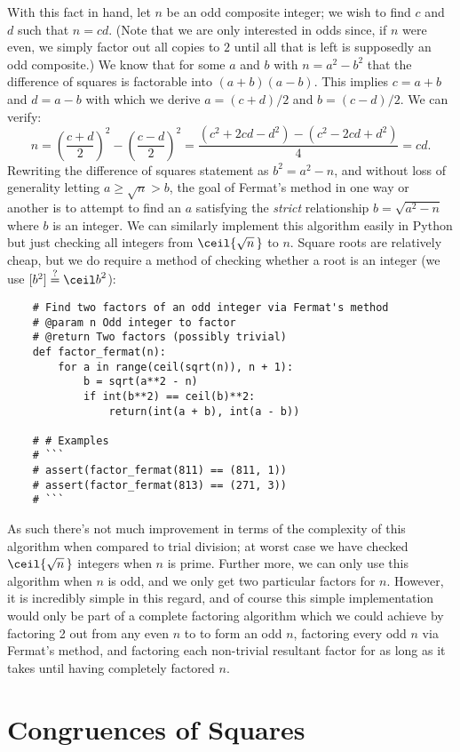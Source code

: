 \documentclass{report}
\begin{document}
With this fact in hand, let $n$ be an odd composite integer; we wish to find $c$ and $d$ such that
$n=cd$.
(Note that we are only interested in odds since, if $n$ were even, we simply factor out all copies
to $2$ until all that is left is supposedly an odd composite.) We know that for some $a$ and $b$
with $n=a^2-b^2$ that the difference of squares is factorable into $(a+b)(a-b)$. This implies
$c=a+b$ and $d=a-b$ with which we derive $a=(c+d)/2$ and $b=(c-d)/2$. We can verify:
\[
    n
    = {\left(\frac{c+d}{2}\right)}^2-{\left(\frac{c-d}{2}\right)}^2
    = \frac{(c^2+2cd-d^2)-(c^2-2cd+d^2)}{4} = cd.
\]
Rewriting the difference of squares statement as $b^2=a^2-n$,
and without loss of generality letting $a\ge\sqrt{n}>b$,
the goal of Fermat's method in one way or another is to attempt to find an $a$
satisfying the \emph{strict} relationship $b=\sqrt{a^2-n}$ where $b$ is an integer.
We can similarly implement this algorithm easily in Python but just checking all integers
from $\ceil{\sqrt{n}\,}$ to $n$.
Square roots are relatively cheap, but we do require a method of checking whether a root is an
integer (we use $[b^2]\overset{?}{=}{\ceil b}^2$):
\begin{verbatim}
    # Find two factors of an odd integer via Fermat's method
    # @param n Odd integer to factor
    # @return Two factors (possibly trivial)
    def factor_fermat(n):
        for a in range(ceil(sqrt(n)), n + 1):
            b = sqrt(a**2 - n)
            if int(b**2) == ceil(b)**2:
                return(int(a + b), int(a - b))

    # # Examples
    # ```
    # assert(factor_fermat(811) == (811, 1))
    # assert(factor_fermat(813) == (271, 3))
    # ```
\end{verbatim}
As such there's not much improvement in terms of the complexity of this algorithm when compared to
trial division; at worst case we have checked $\ceil{\sqrt{n}\,}$ integers when $n$ is prime.
Further more, we can only use this algorithm when $n$ is odd, and we only get two particular factors
for $n$. However, it is incredibly simple in this regard, and of course this simple implementation
would only be part of a complete factoring algorithm which we could achieve by factoring 2 out from
any even $n$ to to form an odd $n$, factoring every odd $n$ via Fermat's method, and factoring each
non-trivial resultant factor for as long as it takes until having completely factored $n$.

\section{Congruences of Squares}
\end{document}
